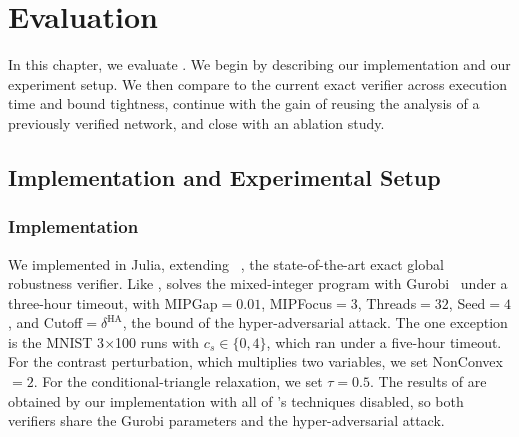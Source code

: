 %
%
\chapter{Evaluation}
\label{ch:evaluation}

In this chapter, we evaluate \tool. We begin by describing our
implementation and our experiment setup. We then compare \tool to the
current exact verifier across execution time and bound tightness,
continue with the gain of reusing the analysis of a previously
verified network, and close with an ablation study.

\section{Implementation and Experimental Setup}
\label{sec:evaluation-overview}

\subsection{Implementation}
\label{sec:evaluation-implementation}

We implemented \tool in Julia, extending
\baseline~\citep{kabaha2024vhagar}, the state-of-the-art exact global
robustness verifier. Like \baseline, \tool solves the mixed-integer
program with Gurobi~\citep{gurobi} under a three-hour timeout, with
MIPGap${=}0.01$, MIPFocus${=}3$, Threads${=}32$, Seed${=}4$, and
Cutoff${=}\delta^{\mathrm{HA}}$, the bound of the hyper-adversarial
attack. The one exception is the MNIST 3$\times$100 runs with
$c_s{\in}\{0,4\}$, which ran under a five-hour timeout.
For the contrast perturbation, which multiplies two variables,
we set NonConvex${=}2$. For the conditional-triangle relaxation, we
set $\tau{=}0.5$. The results of \baseline are obtained by our
implementation with all of \tool's techniques disabled, so both
verifiers share the Gurobi parameters and the hyper-adversarial attack.

